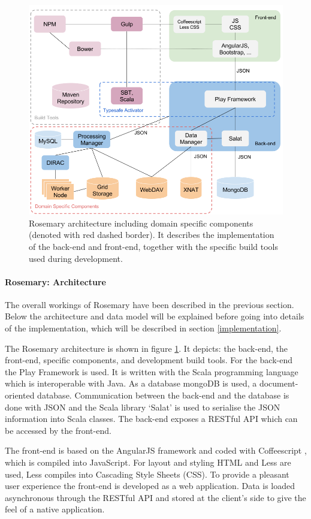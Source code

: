 \begin{figure}[h]
	\centering
	\includegraphics[width=0.7\linewidth]{images/rosemary-architecture}
	\caption{
		Rosemary architecture including domain specific components (denoted with red dashed border).
		It describes the implementation of the \nsg{} back-end and front-end, together with the specific build tools used during development.
	}
	\label{fig:reuse-rosemary-architecture}
\end{figure}

\paragraph{Rosemary: Architecture}
The overall workings of Rosemary have been described in the previous section.
Below the architecture and data model will be explained before going into details of the \ivfprototype{} implementation, which will be described in section \ref{implementation}.

The Rosemary architecture is shown in figure \ref{fig:reuse-rosemary-architecture}.
It depicts: the back-end, the front-end, \nsg{} specific components, and development build tools.
For the back-end the Play Framework \cite{play} is used.
It is written with the Scala \cite{scala} programming language which is interoperable with Java.
As a database mongoDB \cite{mongo} is used, a document-oriented database.
Communication between the back-end and the database is done with JSON \cite{json} and the Scala library `Salat' is used to serialise the JSON information into Scala classes.
The back-end exposes a RESTful API which can be accessed by the front-end.

The front-end is based on the AngularJS \cite{angular} framework and coded with Coffeescript \cite{coffeescript}, which is compiled into JavaScript.
For layout and styling HTML and Less \cite{less} are used, Less compiles into Cascading Style Sheets (CSS).
To provide a pleasant user experience the front-end is developed as a web application. 
Data is loaded asynchronous through the RESTful API and stored at the client's side to give the feel of a native application.

